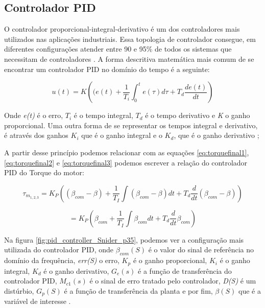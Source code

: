 \subsection{Controlador PID}

O controlador proporcional-integral-derivativo é um dos controladores mais utilizados nas aplicações industriais. Essa topologia de controlador consegue, em diferentes configurações atender entre 90 e 95\% de todos os sistemas que necessitam de controladores \cite{Levine1996}. A forma descritiva matemática mais comum de se encontrar um controlador PID no domínio do tempo é a seguinte:

\begin{equation}
  u(t) = K\left((e(t)+\frac{1}{T_i}\int_{0}^{t}{e(\tau)}d\tau+T_d\frac{de(t)}{dt}\right) 
\end{equation}

Onde \textit{e(t)} é o erro, \textit{$T_i$} é o tempo integral, \textit{$T_d$} é o tempo derivativo e \textit{K} o ganho proporcional. Uma outra forma de se representar os tempos integral e derivativo, é através dos ganhos \textit{$K_i$} que é o ganho integral e o \textit{$K_d$}, que é o ganho derivativo \cite{Astrom1995};

A partir desse princípio podemos relacionar com as equações \ref{eq:torquefinal1}, \ref{eq:torquefinal2} e \ref{eq:torquefinal3} podemos escrever a relação do controlador PID do Torque do motor:

\begin{equation}
\tau_{m_{1,2,3}}=K_{P}\left((\beta_{com}-\beta)+\frac{1}{T_{I}}\int{(\beta_{com}-\beta)dt}+T_{d}\frac{d}{dt}(\beta_{com}-\beta)\right)
\end{equation}

\begin{equation}
=K_{P}\left(\beta_{com}+\frac{1}{T_{I}}\int{\beta_{com}dt}+T_{d}\frac{d}{dt}\beta_{com}\right) 
\end{equation}

Na figura \ref{fig:pid_controller_Snider_p35}, podemos ver a configuração mais utilizada do controlador PID, onde $\beta_{com}(S)$ é o valor do sinal de referência no domínio da frequência, \textit{err(S)} o erro, \textit{$K_p$} é o ganho proporcional, \textit{$K_i$} é o ganho integral, \textit{$K_d$} é o ganho derivativo, \textit{$G_e(s)$} é a função de transferência do controlador PID, \textit{$M_{c1}(s)$} é o sinal de erro tratado pelo controlador, \textit{D(S)} é um distúrbio, \textit{$G_p(S)$} é a função de transferência da planta e por fim, \textit{$\beta(S)$} que é a variável de interesse \cite{Snider}.

